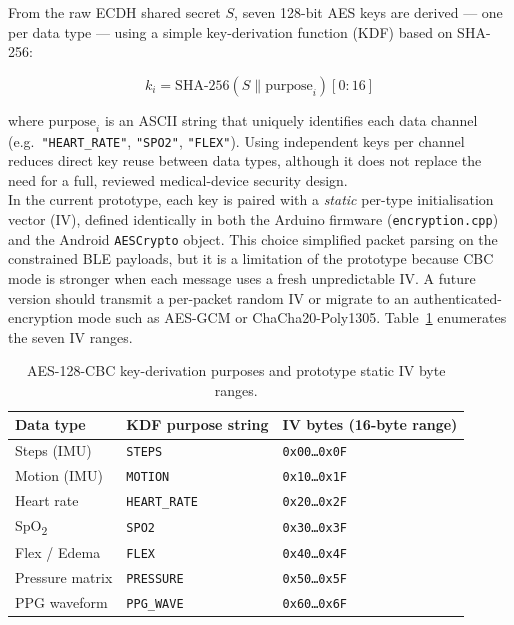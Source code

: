 \noindent From the raw ECDH shared secret $S$, seven 128-bit AES keys are derived — one per data type —
using a simple key-derivation function (KDF) based on SHA-256:

\begin{equation}
  k_i = \text{SHA-256}(S \mathbin{\|} \text{purpose}_i)[0:16]
  \label{eq:kdf}
\end{equation}

\noindent where $\text{purpose}_i$ is an ASCII string that uniquely identifies each data channel
(e.g.\ \texttt{"HEART\_RATE"}, \texttt{"SPO2"}, \texttt{"FLEX"}).  Using independent keys per
channel reduces direct key reuse between data types, although it does not replace the need for a
full, reviewed medical-device security design. \\


\noindent In the current prototype, each key is paired with a \textit{static} per-type initialisation
vector (IV), defined identically in both the Arduino firmware (\texttt{encryption.cpp}) and the
Android \texttt{AESCrypto} object. This choice simplified packet parsing on the constrained BLE
payloads, but it is a limitation of the prototype because CBC mode is stronger when each message
uses a fresh unpredictable IV. A future version should transmit a per-packet random IV or migrate
to an authenticated-encryption mode such as AES-GCM or ChaCha20-Poly1305. Table~\ref{tab:aes_ivs}
enumerates the seven IV ranges. \\

\begin{table}[htbp]
  \centering
  \caption{AES-128-CBC key-derivation purposes and prototype static IV byte ranges.}
  \label{tab:aes_ivs}
  \begin{tabularx}{\textwidth}{l l X}
    \hline
    \textbf{Data type} & \textbf{KDF purpose string} & \textbf{IV bytes (16-byte range)} \\
    \hline
    Steps (IMU)    & \texttt{STEPS}     & \texttt{0x00\ldots0x0F} \\
    Motion (IMU)   & \texttt{MOTION}    & \texttt{0x10\ldots0x1F} \\
    Heart rate     & \texttt{HEART\_RATE} & \texttt{0x20\ldots0x2F} \\
    SpO\textsubscript{2} & \texttt{SPO2} & \texttt{0x30\ldots0x3F} \\
    Flex / Edema  & \texttt{FLEX}      & \texttt{0x40\ldots0x4F} \\
    Pressure matrix & \texttt{PRESSURE} & \texttt{0x50\ldots0x5F} \\
    PPG waveform   & \texttt{PPG\_WAVE} & \texttt{0x60\ldots0x6F} \\
    \hline
  \end{tabularx}
\end{table}

